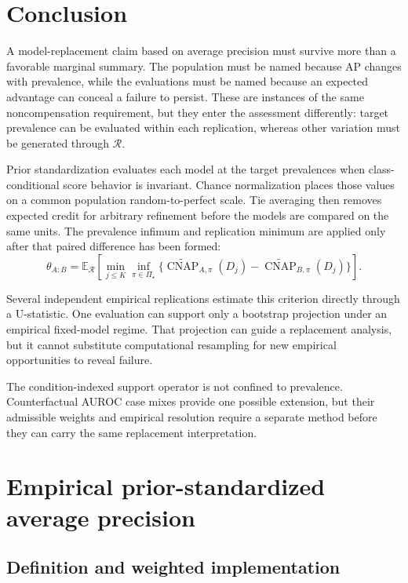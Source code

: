\documentclass[11pt]{article}
\newcommand{\CNAP}{\operatorname{CNAP}}
\newcommand{\Regime}{\mathcal{R}}
\newcommand{\PSet}{\Pi_\star}
\newcommand{\E}{\mathbb{E}}
\newcommand{\CNAPta}{\widetilde{\CNAP}}
\theoremstyle{remark}
\begin{document}
\section{Conclusion}

A model-replacement claim based on average precision must survive more than a favorable marginal summary. The population must be named because AP changes with prevalence, while the evaluations must be named because an expected advantage can conceal a failure to persist. These are instances of the same noncompensation requirement, but they enter the assessment differently: target prevalence can be evaluated within each replication, whereas other variation must be generated through $\Regime$.

Prior standardization evaluates each model at the target prevalences when class-conditional score behavior is invariant. Chance normalization places those values on a common population random-to-perfect scale. Tie averaging then removes expected credit for arbitrary refinement before the models are compared on the same units. The prevalence infimum and replication minimum are applied only after that paired difference has been formed:
\[
\theta_{A:B}
=
\E_{\Regime}
\left[
\min_{j\leq K}
\inf_{\pi\in\PSet}
\{\CNAPta_{A,\pi}(D_j)-\CNAPta_{B,\pi}(D_j)\}
\right].
\]

Several independent empirical replications estimate this criterion directly through a U-statistic. One evaluation can support only a bootstrap projection under an empirical fixed-model regime. That projection can guide a replacement analysis, but it cannot substitute computational resampling for new empirical opportunities to reveal failure.

The condition-indexed support operator is not confined to prevalence. Counterfactual AUROC case mixes provide one possible extension, but their admissible weights and empirical resolution require a separate method before they can carry the same replacement interpretation.

\appendix

\section{Empirical prior-standardized average precision}
\label{app:ap}

\subsection{Definition and weighted implementation}
\end{document}
